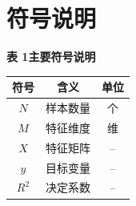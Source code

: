\section{符号说明}

\begin{center}
  {\heiti\bfseries 表 1\quad 主要符号说明}\\[0.6em]
  \begin{tabular}{ccc}
    \toprule
    \textbf{符号} & \textbf{含义} & \textbf{单位} \\
    \midrule
    $N$   & 样本数量 & 个 \\
    $M$   & 特征维度 & 维 \\
    $X$   & 特征矩阵 & -- \\
    $y$   & 目标变量 & -- \\
    $R^2$ & 决定系数 & -- \\
    \bottomrule
  \end{tabular}
\end{center}
